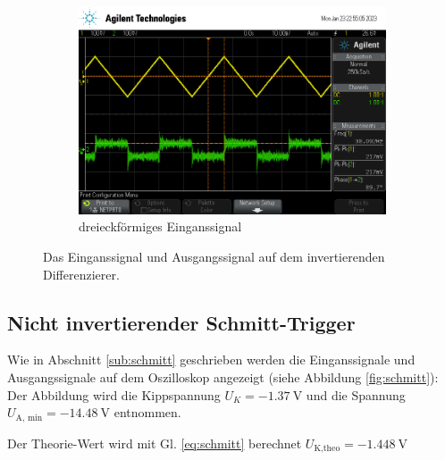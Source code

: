 \begin{figure}
    \begin{subfigure}[b]{0.5\textwidth}
        \centering
        \includegraphics[width=\textwidth]{usb/Dif_Drei.png}
        \caption{dreieckförmiges Einganssignal}
    \end{subfigure}
       \caption{Das Einganssignal und Ausgangssignal auf dem invertierenden Differenzierer.}
       \label{fig:dif_os}
\end{figure}
\FloatBarrier
\subsection{Nicht invertierender Schmitt-Trigger}
Wie in Abschnitt \ref{sub:schmitt} geschrieben werden die Einganssignale und Ausgangssignale
auf dem Oszilloskop angezeigt (siehe Abbildung \ref{fig:schmitt}):
Der Abbildung wird die Kippspannung $U_K = \qty{-1.37}{\V}$ 
und die Spannung $U_\text{A, min} = \qty{-14.48}{\V}  $ entnommen.

Der Theorie-Wert wird mit Gl. \ref{eq:schmitt} berechnet $U_\text{K,theo} = \qty{-1.448}{\V}$

